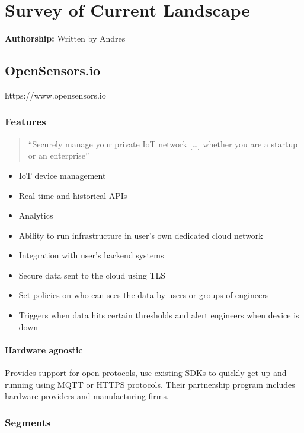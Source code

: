 \section{Survey of Current Landscape}\label{survey-of-current-landscape}

\textbf{Authorship:} Written by Andres

\subsection{OpenSensors.io}\label{opensensors.io}

https://www.opensensors.io

\subsubsection{Features}\label{features}

\begin{quote}
``Securely manage your private IoT network {[}\ldots{}{]} whether you
are a startup or an enterprise''
\end{quote}

\begin{itemize}
\tightlist
\item
  IoT device management
\item
  Real-time and historical APIs
\item
  Analytics
\item
  Ability to run infrastructure in user's own dedicated cloud network
\item
  Integration with user's backend systems
\item
  Secure data sent to the cloud using TLS
\item
  Set policies on who can sees the data by users or groups of engineers
\item
  Triggers when data hits certain thresholds and alert engineers when
  device is down
\end{itemize}

\paragraph{Hardware agnostic}\label{hardware-agnostic}

Provides support for open protocols, use existing SDKs to quickly get up
and running using MQTT or HTTPS protocols. Their partnership program
includes hardware providers and manufacturing firms.

\subsubsection{Segments}\label{segments}

